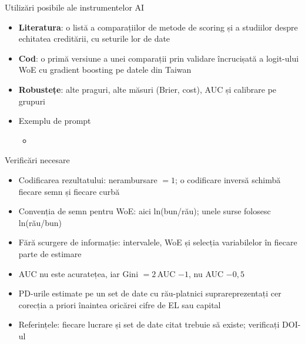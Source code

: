 \begin{frame}{Utilizări posibile ale instrumentelor AI}
\itemsize{\small}
\begin{itemize}
    \item \textbf{Literatura}: o listă a comparațiilor de metode de scoring și a studiilor despre echitatea creditării, cu seturile lor de date
    \item \textbf{Cod}: o primă versiune a unei comparații prin validare încrucișată a logit-ului WoE cu gradient boosting pe datele din Taiwan
    \item \textbf{Robustețe}: alte praguri, alte măsuri (Brier, cost), AUC și calibrare pe grupuri
    \item Exemplu de prompt
    \begin{itemize}
        \item {}
    \end{itemize}
\end{itemize}
\end{frame}

\begin{frame}{Verificări necesare}
\itemsize{\small}
\begin{itemize}
    \item Codificarea rezultatului: nerambursare $= 1$; o codificare inversă schimbă fiecare semn și fiecare curbă
    \item Convenția de semn pentru WoE: aici ln(bun/rău); unele surse folosesc ln(rău/bun)
    \item Fără scurgere de informație: intervalele, WoE și selecția variabilelor în fiecare parte de estimare
    \item AUC nu este acuratețea, iar Gini $= 2\,$AUC $- 1$, nu AUC $- 0{,}5$
    \item PD-urile estimate pe un set de date cu rău-platnici suprareprezentați cer corecția a priori înaintea oricărei cifre de EL sau capital
    \item Referințele: fiecare lucrare și set de date citat trebuie să existe; verificați DOI-ul
\end{itemize}
\end{frame}

